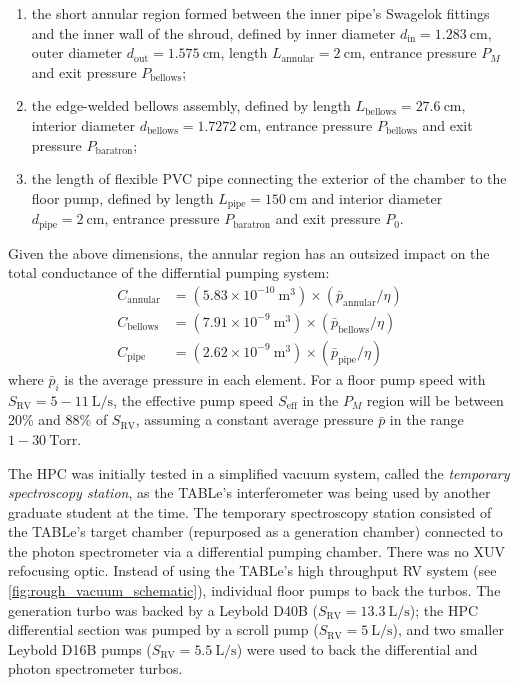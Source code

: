 \begin{enumerate}
	\item the short annular region formed between the inner pipe's Swagelok fittings and the inner wall of the shroud, defined by inner diameter $d_{\textrm{in}} = 1.283 \ \textrm{cm}$, outer diameter $d_{\textrm{out}} = 1.575 \ \textrm{cm}$, length $L_{\textrm{annular}} = 2 \ \textrm{cm}$, entrance pressure $P_M$ and exit pressure $P_{\textrm{bellows}}$;
	\item the edge-welded bellows assembly, defined by length $L_{\textrm{bellows}} = 27.6 \ \textrm{cm}$, interior diameter $d_{\textrm{bellows}} = 1.7272 \ \textrm{cm}$, entrance pressure $P_{\textrm{bellows}}$ and exit pressure $P_{\textrm{baratron}}$;
	\item the length of flexible PVC pipe connecting the exterior of the chamber to the floor pump, defined by length $L_{\textrm{pipe}} = 150 \ \textrm{cm}$ and interior diameter $d_{\textrm{pipe}} = 2 \ \textrm{cm}$, entrance pressure $P_{\textrm{baratron}}$ and exit pressure $P_0$.
\end{enumerate}

Given the above dimensions, the annular region has an outsized impact on the total conductance of the differntial pumping system:
\begin{equation*}
\begin{aligned}
C_{\textrm{annular}} &= (5.83 \times 10^{-10} \ \textrm{m}^{3}) \times (\bar{p}_{\textrm{annular}}/\eta) \\
C_{\textrm{bellows}} &= (7.91 \times 10^{-9} \ \textrm{m}^{3}) \times (\bar{p}_{\textrm{bellows}}/\eta) \\
C_{\textrm{pipe}} &= (2.62 \times 10^{-9} \ \textrm{m}^{3}) \times (\bar{p}_{\textrm{pipe}}/\eta)
\end{aligned}
\end{equation*}
where $\bar{p}_i$ is the average pressure in each element. For a floor pump speed with ${S_{\textrm{RV}} = 5 - 11 \ \textrm{L/s}}$, the effective pump speed $S_{\textrm{eff}}$ in the $P_M$ region will be between 20\% and 88\% of $S_{\textrm{RV}}$, assuming a constant average pressure $\bar{p}$ in the range ${1 - 30 \ \textrm{Torr}}$.

The HPC was initially tested in a simplified vacuum system, called the \textit{temporary spectroscopy station}, as the TABLe's interferometer was being used by another graduate student at the time. The temporary spectroscopy station consisted of the TABLe's target chamber (repurposed as a generation chamber) connected to the photon spectrometer via a differential pumping chamber. There was no XUV refocusing optic. Instead of using the TABLe's high throughput RV system (see \cref{fig:rough_vacuum_schematic}), individual floor pumps to back the turbos. The generation turbo was backed by a Leybold D40B ($S_{\textrm{RV}} = 13.3 \ \textrm{L/s}$); the HPC differential section was pumped by a scroll pump ($S_{\textrm{RV}} = 5 \ \textrm{L/s}$), and two smaller Leybold D16B pumps ($S_{\textrm{RV}} = 5.5 \ \textrm{L/s}$) were used to back the differential and photon spectrometer turbos.


